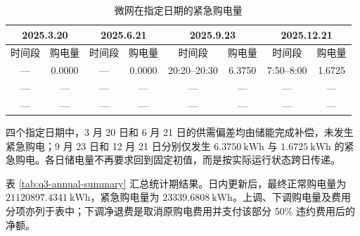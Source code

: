 \documentclass[12pt,a4paper]{ctexart}
\begin{document}
\begin{table}[H]
\centering
\caption{微网在指定日期的紧急购电量}
\label{tab:q3-emergency-selected}
\renewcommand{\arraystretch}{1.15}
\begin{tabular}{|c|c|c|c|c|c|c|c|}
\hline
\multicolumn{2}{|c|}{2025.3.20} &
\multicolumn{2}{c|}{2025.6.21} &
\multicolumn{2}{c|}{2025.9.23} &
\multicolumn{2}{c|}{2025.12.21} \\
\hline
时间段 & 购电量 & 时间段 & 购电量 & 时间段 & 购电量 & 时间段 & 购电量 \\
\hline
--- & 0.0000 & --- & 0.0000 &
20:20--20:30 & 6.3750 & 7:50--8:00 & 1.6725 \\
\hline
--- & --- & --- & --- & --- & --- & --- & --- \\
\hline
--- & --- & --- & --- & --- & --- & --- & --- \\
\hline
\end{tabular}
\end{table}

四个指定日期中，3 月 20 日和 6 月 21 日的供需偏差均由储能完成补偿，未发生紧急购电；9 月 23 日和 12 月 21 日分别仅发生 $6.3750\ \mathrm{kWh}$ 与 $1.6725\ \mathrm{kWh}$ 的紧急购电。各日储电量不再要求回到固定初值，而是按实际运行状态跨日传递。

表 \ref{tab:q3-annual-summary} 汇总统计期结果。日内更新后，最终正常购电量为 $21120897.4341\ \mathrm{kWh}$，紧急购电量为 $23339.6808\ \mathrm{kWh}$。上调、下调购电量及费用分项亦列于表中；下调净退费是取消原购电费用并支付该部分 50\% 违约费用后的净额。
\end{document}
